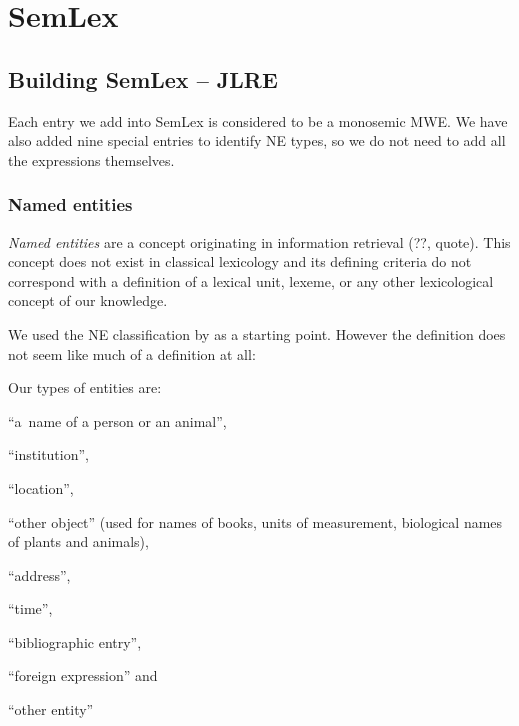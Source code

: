 
\chapter{SemLex}
\label{sec:semlex}

\section{Building SemLex – JLRE}
\label{sec:semlex:build}
Each entry we add into SemLex is considered to be a monosemic MWE. 
We have also added nine special entries to identify NE types, so we do not need to add all the expressions themselves.

\subsection{Named entities}
\emph{Named entities} are a concept originating in information retrieval (??, quote). This concept does not exist in classical lexicology and its defining criteria do not correspond with a definition of a lexical unit, lexeme, or any other lexicological concept of our knowledge.

We used the NE classification by \citet{sevcikova:2007} as a starting point. However the definition does not seem like much of a definition at all:



Our types of entities are:
\begin{compactenum}
\item ``a~name of a person or an animal'', 
\item``institution'', 
\item``location'', 
\item``other object'' (used for names of books, units of measurement, biological names of plants and animals), 
\item``address'', 
\item``time'', 
\item``bibliographic entry'', 
\item``foreign expression'' and 
\item``other entity''
\end{compactenum}

